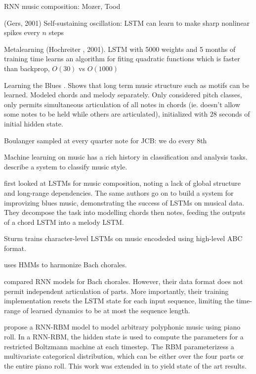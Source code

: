 \documentclass[dissertation.tex]{subfiles}
\begin{document}
RNN music composition: Mozer, Tood

(Gers, 2001) Self-sustaining oscillation: LSTM can learn to make sharp nonlinear spikes every $n$ steps

Metalearning (Hochreiter , 2001). LSTM with 5000 weights and 5 months of training time
learns an algorithm for fiting quadratic functions which is faster than backprop, $O(30)$ vs $O(1000)$

Learning the Blues \cite{Eck2002}. Shows that long term music structure such as motifs can be learned.
Modeled chords and melody separately.
Only considered pitch classes, only permits simultaneous articulation of all
notes in chords (ie. doesn't allow some notes to be held while others are
articulated), initialized with $28$ seconds of initial hidden state.


Boulanger sampled at every quarter note for JCB: we do every 8th 

Machine learning on music has a rich history in classification and analysis tasks.
\cite{Herlands2014} describe a system to classify music style.

\cite{Eck2002} first looked at LSTMs for music composition, noting a lack of global
structure and long-range dependencies. The same authors \cite{Eck2002-blues} go on
to build a system for improvizing blues music, demonstrating the success of
LSTMs on musical data. They decompose the task into modelling chords
then notes, feeding the outputs of a chord LSTM into a melody LSTM.

Sturm trains character-level LSTMs on music encodeded using high-level ABC format. 

\cite{Allan2005} uses HMMs to harmonize Bach chorales. 

\cite{Brien2016} compared RNN models for Bach chorales. However, their data format does not permit independent
articulation of parts. More importantly, their training implementation resets the LSTM state for each input
sequence, limiting the time-range of learned dynamics to be at most the sequence length.

\cite{Boulanger-Lewandowski2012} propose a RNN-RBM model to model arbitrary
polyphonic music using piano roll. In a RNN-RBM, the hidden state is used to
compute the parameters for a restricted Boltzmann machine at each timestep. The
RBM parameterizess a multivariate categorical distribution, which can be either
over the four parts or the entire piano roll. This work was extended in
\cite{Lyu2015} to yield state of the art results.
\end{document}
